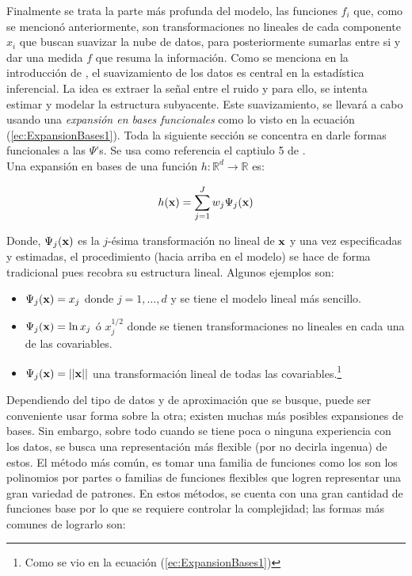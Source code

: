 \documentclass[../Main/Main.tex]{subfiles}
\begin{document}
Finalmente se trata la parte más profunda del modelo, las funciones $f_i$  que, como se mencionó anteriormente, son transformaciones no lineales de cada componente $x_i$ que buscan suavizar la nube de datos, para posteriormente sumarlas entre si y dar una medida $f$ que resuma la información. Como se menciona en la introducción de \autocite{hardle2004semiparametric}, el suavizamiento de los datos es central en la estadística inferencial. La idea es extraer la señal entre el ruido y para ello, se intenta estimar y modelar la estructura subyacente. Este suavizamiento, se llevará a cabo usando una \textit{expansión en bases funcionales} como lo visto en la ecuación (\ref{ec:ExpansionBases1}). Toda la siguiente sección se concentra en darle formas funcionales a las $\Psi$'s. Se usa como   referencia el captiulo 5 de \autocite{hastie2008elements}. \\

Una expansión en bases de una función $h:\mathbb{R}^d\rightarrow\mathbb{R}$ es:

\begin{align} 
	h(\mathbf{x}) = \sum_{j = 1}^J w_j\Psi_j(\mathbf{x}) \label{ec:ExpansionBases2}
\end{align}

Donde, $\Psi_j(\mathbf{x})$ es la $j$-ésima transformación no lineal de $\mathbf{x}$ y una vez especificadas y estimadas, el procedimiento (hacia arriba en el modelo) se hace de forma tradicional pues recobra su estructura lineal. Algunos ejemplos son:

\begin{itemize}
	\item $\Psi_j(\mathbf{x}) = x_j$ donde $j = 1,\ldots,d$ y se tiene el modelo lineal más sencillo.
	\item $\Psi_j(\mathbf{x}) = \ln x_j$ ó $x_j^{1/2}$ donde se tienen transformaciones no lineales en cada una de las covariables.
	\item $\Psi_j(\mathbf{x}) = ||\mathbf{x}||$ una transformación lineal de todas las covariables.\footnote{Como se vio en la ecuación (\ref{ec:ExpansionBases1})} 
\end{itemize}

Dependiendo del tipo de datos y de aproximación que se busque, puede ser conveniente usar forma sobre la otra; existen muchas más posibles expansiones de bases. Sin embargo, sobre todo cuando se tiene poca o ninguna experiencia con los datos, se busca una representación más flexible (por no decirla ingenua) de estos. El método más común, es tomar una familia de funciones como los son los polinomios por partes o familias de funciones flexibles que logren representar una gran variedad de patrones. En estos métodos, se cuenta con una gran cantidad de funciones base por lo que se requiere controlar la complejidad; las formas más comunes de lograrlo son:
\end{document}
